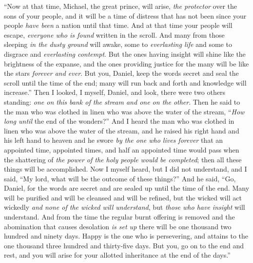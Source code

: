 \begin{biblechapter} %
 “Now at that time, Michael, the great prince, will arise, \textit{the protector} over the sons of your people, and it will be a time of distress that has not been since your people \textit{have been} a nation until that time. And at that time your people will escape, \textit{everyone who is found} written in the scroll.
\verse And many from those sleeping \textit{in the dusty ground} will awake, some to \textit{everlasting life} and some to disgrace and \textit{everlasting contempt}.
\verse But the ones having insight will shine like the brightness of the expanse, and the ones providing justice for the many will be like the stars \textit{forever and ever}.
\verse But you, Daniel, keep the words secret and seal the scroll until the time of the end; many will run back and forth and knowledge will increase.”
\verse Then I looked, I myself, Daniel, and look, there were two others standing: \textit{one on this bank of the stream and one on the other}.
\verse Then he said to the man who was clothed in linen who was above the water of the stream, “\textit{How long until} the end of the wonders?”
\verse And I heard the man who was clothed in linen who was above the water of the stream, and he raised his right hand and his left hand to heaven and he swore \textit{by the one who lives forever} that an appointed time, appointed times, and half an appointed time would pass when the shattering of \textit{the power of the holy people} \textit{would be completed}; then all these things will be accomplished.
 Now I myself heard, but I did not understand, and I said, “My lord, what will be the outcome of these things?”
\verse And he said, “Go, Daniel, for the words are secret and are sealed up until the time of the end.
\verse Many will be purified and will be cleansed and will be refined, but the wicked will act wickedly \textit{and none of the wicked will understand}, but \textit{those who have insight} will understand.
\verse And from the time the regular burnt offering is removed and the abomination that causes desolation \textit{is set up} there will be one thousand two hundred and ninety days.
\verse Happy is the one who is persevering, and attains to the one thousand three hundred and thirty-five days.
\verse But you, go on to the end and rest, and you will arise for your allotted inheritance at the end of the days.”
\end{biblechapter}

